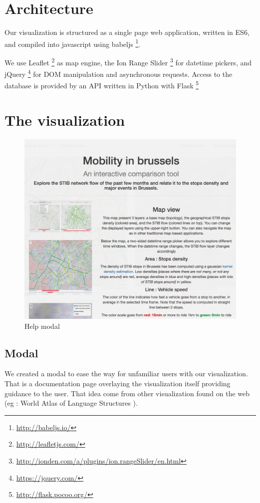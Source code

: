 \documentclass[11pt]{article}%
\begin{document}
\section{Architecture}
Our visualization is structured as a single page web application, written in ES6, and compiled into javascript using babeljs \footnote{\url{http://babeljs.io/}}.

We use Leaflet \footnote{\url{http://leafletjs.com/}} as map engine, the Ion Range Slider \footnote{\url{http://ionden.com/a/plugins/ion.rangeSlider/en.html}} for datetime pickers, and jQuery \footnote{\url{https://jquery.com/}} for DOM manipulation and asynchronous requests. Access to the database is provided by an API written in Python with Flask \footnote{\url{http://flask.pocoo.org/}}

\section{The visualization}


\begin{minipage}{0.4\textwidth}
  \begin{figure}[H]
    \includegraphics[width=\textwidth]{images/modal.png}
    \caption{Help modal}
  \end{figure}
\end{minipage}\hfill
\begin{minipage}{0.58\textwidth}
  \subsection{Modal}
  We created a modal to ease the way for unfamiliar users with our visualization. That is a documentation page overlaying the visualization itself providing guidance to the user. That idea come from other visualization found on the web (eg : World Atlas of Language Structures \cite{visuawithmodal}).
\end{minipage}
\end{document}
